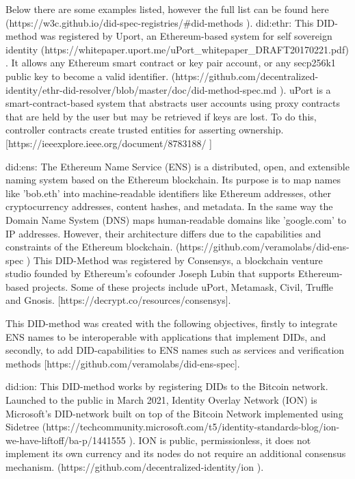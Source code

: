 Below there are some examples listed, however the full list can be found here (https://w3c.github.io/did-spec-registries/#did-methods ). 
did:ethr:
This DID-method was registered by Uport, an Ethereum-based system for self sovereign identity (https://whitepaper.uport.me/uPort_whitepaper_DRAFT20170221.pdf) . It allows any Ethereum smart contract or key pair account, or any secp256k1 public key to become a valid identifier. (https://github.com/decentralized-identity/ethr-did-resolver/blob/master/doc/did-method-spec.md ). uPort is a smart-contract-based system that abstracts user accounts using proxy contracts that are held by the user but may be retrieved if keys are lost. To do this, controller contracts create trusted entities for asserting ownership. [https://ieeexplore.ieee.org/document/8783188/ ]


did:ens:
The Ethereum Name Service (ENS) is a distributed, open, and extensible naming system based on the Ethereum blockchain. Its purpose is to map names like 'bob.eth' into machine-readable identifiers like Ethereum addresses, other cryptocurrency addresses, content hashes, and metadata. In the same way the Domain Name System (DNS) maps human-readable domains like 'google.com' to IP addresses. However, their architecture differs due to the capabilities and constraints of the Ethereum blockchain. (https://github.com/veramolabs/did-ens-spec )
This DID-Method was registered by Consensys, a blockchain venture studio founded by Ethereum's cofounder Joseph Lubin that supports Ethereum-based projects. Some of these projects include uPort, Metamask, Civil, Truffle and Gnosis. [https://decrypt.co/resources/consensys]. 


This DID-method was created with the following objectives, firstly to integrate ENS names to be interoperable with applications that implement DIDs, and secondly, to add DID-capabilities to ENS names such as services and verification methods [https://github.com/veramolabs/did-ens-spec].

did:ion:
This DID-method works by registering DIDs to the Bitcoin network. Launched to the public in March 2021, Identity Overlay Network (ION) is Microsoft's DID-network built on top of the Bitcoin Network implemented using Sidetree (https://techcommunity.microsoft.com/t5/identity-standards-blog/ion-we-have-liftoff/ba-p/1441555 ). 
ION is public, permissionless, it does not implement its own currency and its nodes do not require an additional consensus mechanism. (https://github.com/decentralized-identity/ion ).

